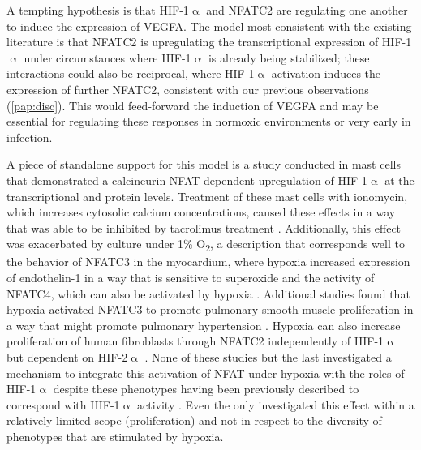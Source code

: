 A tempting hypothesis is that HIF\hyp{}1$\upalpha$ and NFATC2 are regulating one another to induce the expression of VEGFA. The model most consistent with the existing literature is that NFATC2 is upregulating the transcriptional expression of HIF\hyp{}1$\upalpha$ under circumstances where HIF\hyp{}1$\upalpha$ is already being stabilized; these interactions could also be reciprocal, where HIF\hyp{}1$\upalpha$ activation induces the expression of further NFATC2, consistent with our previous observations (\autoref{pap:disc}). This would feed\hyp{}forward the induction of VEGFA and may be essential for regulating these responses in normoxic environments or very early in infection. 

A piece of standalone support for this model is a study conducted in mast cells that demonstrated a calcineurin\hyp{}NFAT dependent upregulation of HIF\hyp{}1$\upalpha$ at the transcriptional and protein levels. Treatment of these mast cells with ionomycin, which increases cytosolic calcium concentrations, caused these effects in a way that was able to be inhibited by tacrolimus treatment \citep{WalczakDrzewiecka2008}. Additionally, this effect was exacerbated by culture under 1\% O\textsubscript{2}, a description that corresponds well to the behavior of NFATC3 in the myocardium, where hypoxia increased expression of endothelin\hyp{}1 in a way that is sensitive to superoxide and the activity of NFATC4, which can also be activated by hypoxia \citep{deFrutos2011, RamiroDiaz2014, Moreno2015}. Additional studies found that hypoxia activated NFATC3 to promote pulmonary smooth muscle proliferation in a way that might promote pulmonary hypertension \citep{Hou2013}. Hypoxia can also increase proliferation of human fibroblasts through NFATC2 independently of HIF\hyp{}1$\upalpha$ but dependent on HIF\hyp{}2$\upalpha$ \citep{Senavirathna2018}. None of these studies but the last investigated a mechanism to integrate this activation of NFAT under hypoxia with the roles of HIF\hyp{}1$\upalpha$ despite these phenotypes having been previously described to correspond with HIF\hyp{}1$\upalpha$ activity \citep{Cui2021, Qi2017, Li2014, Thackaberry2002, SonanezOrganis2016}. Even the \citeauthor{Senavirathna2018} only investigated this effect within a relatively limited scope (proliferation) and not in respect to the diversity of phenotypes that are stimulated by hypoxia.

